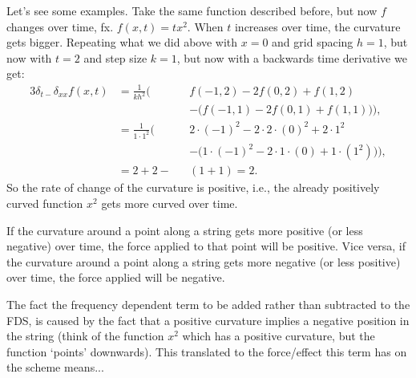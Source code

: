 Let's see some examples. Take the same function described before, but now $f$ changes over time, fx. $f(x, t)=tx^2$. When $t$ increases over time, the curvature gets bigger. Repeating what we did above with $x=0$ and grid spacing $h = 1$, but now with $t=2$ and step size $k=1$, but now with a backwards time derivative we get:
  \begin{alignat*}{3}
    \delta_{t-}\delta_{xx}f(x,t) &= \frac{1}{kh^2}\bigg(&&f(-1, 2) - 2f(0, 2) + f(1, 2) \\
    & &&- \Big(f(-1, 1) - 2f(0, 1) + f(1, 1)\Big)\bigg),\\
    & = \frac{1}{1\cdot 1^2}\bigg(&&2\cdot(-1)^2-2\cdot2\cdot(0)^2+2\cdot1^2\\
    & &&-\Big(1\cdot(-1)^2-2\cdot1\cdot(0)+1\cdot(1^2)\Big)\Bigg),\\
    &=2+2-&&(1+1)=2.
  \end{alignat*}
So the rate of change of the curvature is positive, i.e., the already positively curved function $x^2$ gets more curved over time.

If the curvature around a point along a string gets more positive (or less negative) over time, the force applied to that point will be positive. Vice versa, if the curvature around a point along a string gets more negative (or less positive) over time, the force applied will be negative.
 
The fact the frequency dependent term to be added rather than subtracted to the FDS, is caused by the fact that a positive curvature implies a negative position in the string (think of the function $x^2$ which has a positive curvature, but the function `points' downwards). This translated to the force/effect this term has on the scheme means...
